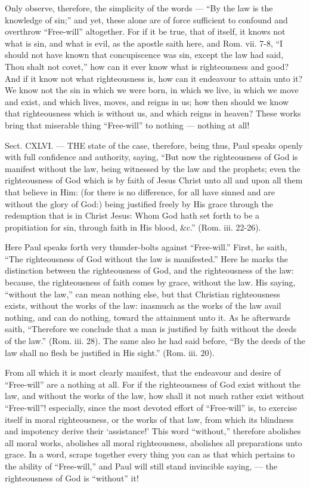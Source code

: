 Only observe, therefore, the simplicity of the words — “By the law is the knowledge of sin;” and yet, these alone are of force sufficient to confound and overthrow “Free-will” altogether. For if it be true, that of itself, it knows not what is sin, and what is evil, as the apostle saith here, and Rom. vii. 7-8, “I should not have known that concupiscence was sin, except the law had said, Thou shalt not covet,” how can it ever know what is righteousness and good? And if it know not what righteousness is, how can it endeavour to attain unto it? We know not the sin in which we were born, in which we live, in which we move and exist, and which lives, moves, and reigns in us; how then should we know that righteousness which is without us, and which reigns in heaven? These works bring that miserable thing “Free-will” to nothing — nothing at all!


Sect. CXLVI. — THE state of the case, therefore, being thus, Paul speaks openly with full confidence and authority, saying, “But now the righteousness of God is manifest without the law, being witnessed by the law and the prophets; even the righteousness of God which is by faith of Jesus Christ unto all and upon all them that believe in Him: (for there is no difference, for all have sinned and are without the glory of God:) being justified freely by His grace through the redemption that is in Christ Jesus: Whom God hath set forth to be a propitiation for sin, through faith in His blood, \&c.” (Rom. iii. 22-26).

Here Paul speaks forth very thunder-bolts against “Free-will.” First, he saith, “The righteousness of God without the law is manifested.” Here he marks the distinction between the righteousness of God, and the righteousness of the law: because, the righteousness of faith comes by grace, without the law. His saying, “without the law,” can mean nothing else, but that Christian righteousness exists, without the works of the law: inasmuch as the works of the law avail nothing, and can do nothing, toward the attainment unto it. As he afterwards saith, “Therefore we conclude that a man is justified by faith without the deeds of the law.” (Rom. iii. 28). The same also he had said before, “By the deeds of the law shall no flesh be justified in His sight.” (Rom. iii. 20).

From all which it is most clearly manifest, that the endeavour and desire of “Free-will” are a nothing at all. For if the righteousness of God exist without the law, and without the works of the law, how shall it not much rather exist without “Free-will”! especially, since the most devoted effort of “Free-will” is, to exercise itself in moral righteousness, or the works of that law, from which its blindness and impotency derive their ‘assistance!’ This word “without,” therefore abolishes all moral works, abolishes all moral righteousness, abolishes all preparations unto grace. In a word, scrape together every thing you can as that which pertains to the ability of “Free-will,” and Paul will still stand invincible saying, — the righteousness of God is “without” it!

